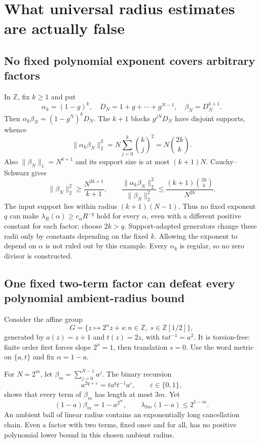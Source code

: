 \documentclass[11pt,a4paper,oneside]{report}
\theoremstyle{definition}
\theoremstyle{remark}
\newcommand{\Z}{\mathbb Z}
\begin{document}
\section{What universal radius estimates are actually false}

\subsection{No fixed polynomial exponent covers arbitrary factors}

In $\Z$, fix $k\ge1$ and put
\[
\alpha_k=(1-g)^k,\quad D_N=1+g+\cdots+g^{N-1},\quad
\beta_N=D_N^{k+1}.
\]
Then $\alpha_k\beta_N=(1-g^N)^kD_N$. The $k+1$ blocks
$g^{jN}D_N$ have disjoint supports, whence
\[
\|\alpha_k\beta_N\|_2^2=N\sum_{j=0}^k\binom kj^2
=N\binom{2k}{k}.
\]
Also $\|\beta_N\|_1=N^{k+1}$ and its support size is at
most $(k+1)N$. Cauchy--Schwarz gives
\[
\|\beta_N\|_2^2\ge\frac{N^{2k+1}}{k+1},\qquad
\boxed{\frac{\|\alpha_k\beta_N\|_2^2}{\|\beta_N\|_2^2}
\le\frac{(k+1)\binom{2k}{k}}{N^{2k}}.}
\]
The input support lies within radius $(k+1)(N-1)$.
Thus no fixed exponent $q$ can make
$\lambda_R(\alpha)\ge c_\alpha R^{-q}$ hold for every
$\alpha$, even with a different positive constant for each
factor: choose $2k>q$. Support-adapted generators change
these radii only by constants depending on the fixed $k$.
Allowing the exponent to depend on $\alpha$ is not ruled out
by this example. Every $\alpha_k$ is regular, so no zero
divisor is constructed.

\subsection{One fixed two-term factor can defeat every polynomial ambient-radius bound}

Consider the affine group
\[
G=\{z\mapsto2^n z+s:n\in\Z,\ s\in\Z[1/2]\},
\]
generated by $a(z)=z+1$ and $t(z)=2z$, with
$tat^{-1}=a^2$. It is torsion-free: finite order first
forces slope $2^n=1$, then translation $s=0$.
Use the word metric on $\{a,t\}$ and fix $\alpha=1-a$.

For $N=2^m$, let $\beta_m=\sum_{j=0}^{N-1}a^j$.
The binary recursion
\[
a^{2q+\varepsilon}=ta^qt^{-1}a^\varepsilon,
\qquad\varepsilon\in\{0,1\},
\]
shows that every term of $\beta_m$ has length at most $3m$.
Yet
\[
(1-a)\beta_m=1-a^{2^m},\qquad
\boxed{\lambda_{3m}(1-a)\le2^{1-m}.}
\]
An ambient ball of linear radius contains an exponentially
long cancellation chain. Even a factor with two terms,
fixed once and for all, has no positive polynomial lower
bound in this chosen ambient radius.
\end{document}

